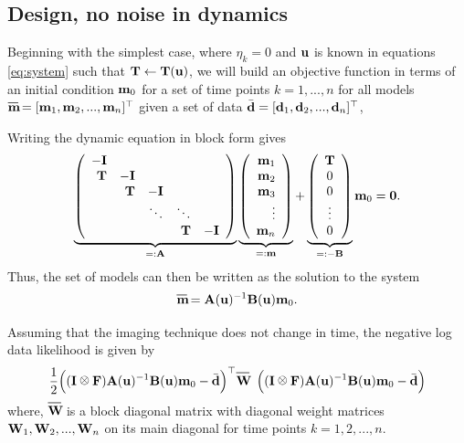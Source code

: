 \documentclass[12pt]{article}
\newcommand {\bu}   { {\bf u} }   	%
\newcommand {\bfd}   { {\bf d} }
\newcommand {\bfu}   { {\bf u} }
\newcommand {\bfm}   { {\bf m} }
\newcommand{\hf}		 {\frac12}
\newcommand{\bA}  { {\bf A} }      %
\newcommand{\bB}  { {\bf B} }      %
\newcommand{\bI}  { {\bf I} }      %
\newcommand{\bF}  { {\bf F} }      %
\newcommand{\bT}  {\text{\bf T}} %
\newcommand{\bfW}  {\text{{\bf W}}} %
\newcommand*\xbar[1]{%
  \hbox{%
    \vbox{%
      \hrule height 0.5pt %
      \kern0.5ex%
      \hbox{%
        \kern-0.em%
        \ensuremath{#1}%
        \kern-0.15em%
      }%
    }%
  }%
}
\newcommand{\mbar}{\xbar{\bf m}}
\def\kronecker{\raisebox{1pt}{\ensuremath{\:\otimes\:}}}
\begin{document}
\subsection{Design,  no noise in dynamics}
\label{noNoise}
Beginning with the simplest case, where $\eta_k = 0$ and $\bfu$ is known in equations \eqref{eq:system} such that $\bT \leftarrow \bT(\bfu)$, we will build an objective function in terms of an initial condition $\bfm_0$ for a set of time points $k = 1,...,n$
 for all  models $\mbar = [\bfm_1,\bfm_2,...,\bfm_n]^{\top}$ given a set of data $\bar{\bfd} = [\bfd_1,\bfd_2,...,\bfd_n]^{\top}$,

 Writing the dynamic equation in block form gives
\begin{equation}\label{eq:FlowSystem}
	 \underbrace{
		\left( 
			\begin{array}{rrrrr}
				- \bI      &           &         &        &        \\
				  \bT & -\bI      &         &        &        \\
				           &  \bT & -\bI    &        &        \\
				           &           &  \ddots & \ddots &        \\
				           &           &         & \bT    & -\bI   \\
			\end{array}
		\right)
	 }_{=: \bA}
	 \underbrace{
		\left(
			\begin{array}{r}
				\bfm_1 \\ \bfm_2 \\ \bfm_3 \\ \vdots \\ \bfm_n
			\end{array}
		\right)
	 }_{=: \bfm}
	+
	 \underbrace{
		\left(
			\begin{array}{c}
			\bT \\ 0  \\ 0\\ \vdots \\ 0
			\end{array}
		\right)
	 }_{=: -\bB}
	\bfm_0
	= 
	{\bf 0}.
\end{equation}
Thus, the set of models can then be written as the solution to the system
\begin{equation}
\mbar = \bA(\bu)^{-1} \bB(\bu) \bfm_0.
\end{equation}

Assuming that the imaging technique does not change in time, the  negative log data likelihood is given by
\begin{equation}
\hf \Big((\bI \kronecker \bF) \bA(\bu)^{-1} \bB(\bu) \bfm_0- \bar{\bfd} \Big)^{\top} \xbar{\bfW} \;\; \Big((\bI \kronecker \bF)  \bA(\bu)^{-1} \bB(\bu) \bfm_0 -\bar{\bfd} \Big)
\end{equation}
where, $\xbar{\bfW}$ is a block diagonal matrix with diagonal weight matrices $\bfW_1,\bfW_2,...,\bfW_n$ on its main diagonal for  time points $ k = 1,2,...,n$.
\end{document}
